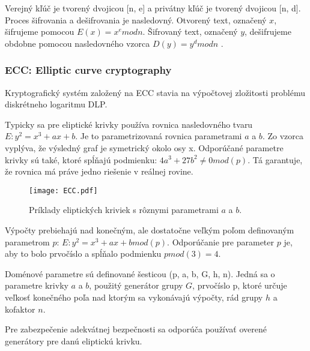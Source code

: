 \documentclass[12pt,a4paper,oneside,openright]{report}
\begin{document}
Verejný kľúč je tvorený dvojicou [n, e] a privátny kľúč je tvorený dvojicou [n, d].
Proces šifrovania a dešifrovania je nasledovný. Otvorený text, označený $x$, šifrujeme pomocou $E(x)=x^e mod n$. Šifrovaný text, označený $y$, dešifrujeme obdobne pomocou nasledovného vzorca $D(y)=y^d mod n$ \cite{rsalesson}.


\subsubsection{ECC: Elliptic curve cryptography}
Kryptografický systém založený na ECC stavia na výpočtovej zložitosti problému diskrétneho logaritmu DLP.


Typicky sa pre eliptické krivky používa rovnica nasledovného tvaru $E:y^2=x^3+ax+b$. Je to parametrizovaná rovnica parametrami $a$ a $b$. Zo vzorca vyplýva, že výsledný graf je symetrický okolo osy x.
Odporúčané parametre krivky sú také, ktoré spĺňajú podmienku: $4a^3 + 27b^2\neq0  mod(p)$. Tá garantuje, že rovnica má práve jedno riešenie v reálnej rovine.

\begin{figure}[h]
	\centering
	{\texttt{[image: ECC.pdf]}}
	\caption{Príklady eliptických kriviek s rôznymi parametrami $a$ a $b$.}
	\label{f:o_ECC}
\end{figure}

Výpočty prebiehajú nad konečným, ale dostatočne veľkým poľom definovaným parametrom $p$: $E:y^2=x^3+ax+b mod(p)$.
Odporúčanie pre parameter $p$ je, aby to bolo prvočíslo a spĺňalo podmienku $p mod(3) = 4$.

Doménové parametre sú definované šesticou (p, a, b, G, h, n). Jedná sa o parametre krivky $a$ a $b$, použitý generátor grupy $G$, prvočíslo p, ktoré určuje veľkosť konečného poľa nad ktorým sa vykonávajú výpočty, rád grupy $h$ a kofaktor $n$\cite{ecclesson}.

Pre zabezpečenie adekvátnej bezpečnosti sa odporúča používať overené generátory pre danú eliptickú krivku.
\end{document}
